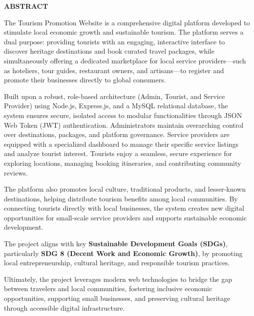 \newpage
\thispagestyle{empty}

\begin{center}
\fontsize{16pt}{18pt}\selectfont
\textbf{ABSTRACT}
\end{center}

\vspace{1cm}

The Tourism Promotion Website is a comprehensive digital platform developed to stimulate local economic growth and sustainable tourism. The platform serves a dual purpose: providing tourists with an engaging, interactive interface to discover heritage destinations and book curated travel packages, while simultaneously offering a dedicated marketplace for local service providers---such as hoteliers, tour guides, restaurant owners, and artisans---to register and promote their businesses directly to global consumers.

Built upon a robust, role-based architecture (Admin, Tourist, and Service Provider) using Node.js, Express.js, and a MySQL relational database, the system ensures secure, isolated access to modular functionalities through JSON Web Token (JWT) authentication. Administrators maintain overarching control over destinations, packages, and platform governance. Service providers are equipped with a specialized dashboard to manage their specific service listings and analyze tourist interest. Tourists enjoy a seamless, secure experience for exploring locations, managing booking itineraries, and contributing community reviews.

The platform also promotes local culture, traditional products, and lesser-known destinations, helping distribute tourism benefits among local communities. By connecting tourists directly with local businesses, the system creates new digital opportunities for small-scale service providers and supports sustainable economic development.

The project aligns with key \textbf{Sustainable Development Goals (SDGs)}, particularly \textbf{SDG 8 (Decent Work and Economic Growth)}, by promoting local entrepreneurship, cultural heritage, and responsible tourism practices.

Ultimately, the project leverages modern web technologies to bridge the gap between travelers and local communities, fostering inclusive economic opportunities, supporting small businesses, and preserving cultural heritage through accessible digital infrastructure.
